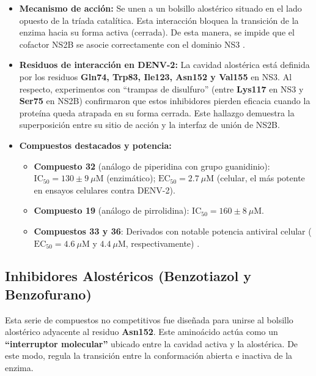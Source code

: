 \begin{itemize}
    \item \textbf{Mecanismo de acción:} Se unen a un bolsillo alostérico situado en el lado opuesto de la tríada catalítica. Esta interacción bloquea la transición de la enzima hacia su forma activa (cerrada). De esta manera, se impide que el cofactor NS2B se asocie correctamente con el dominio NS3 \cite{zephyr2023allosteric}.
    \item \textbf{Residuos de interacción en DENV-2:} La cavidad alostérica está definida por los residuos \textbf{Gln74, Trp83, Ile123, Asn152 y Val155} en NS3. Al respecto, experimentos con ``trampas de disulfuro'' (entre \textbf{Lys117} en NS3 y \textbf{Ser75} en NS2B) confirmaron que estos inhibidores pierden eficacia cuando la proteína queda atrapada en su forma cerrada. Este hallazgo demuestra la superposición entre su sitio de acción y la interfaz de unión de NS2B.
    \item \textbf{Compuestos destacados y potencia:}
    \begin{itemize}
        \item \textbf{Compuesto 32} (análogo de piperidina con grupo guanidinio): $\text{IC}_{50} = 130 \pm 9\ \mu\text{M}$ (enzimático); $\text{EC}_{50} = 2.7\ \mu\text{M}$ (celular, el más potente en ensayos celulares contra DENV-2).
        \item \textbf{Compuesto 19} (análogo de pirrolidina): $\text{IC}_{50} = 160 \pm 8\ \mu\text{M}$.
        \item \textbf{Compuestos 33 y 36}: Derivados con notable potencia antiviral celular ($\text{EC}_{50} = 4.6\ \mu\text{M}$ y $4.4\ \mu\text{M}$, respectivamente) \cite{zephyr2023allosteric}.
    \end{itemize}
\end{itemize}
\subsection{Inhibidores Alostéricos (Benzotiazol y Benzofurano)}

Esta serie de compuestos no competitivos fue diseñada para unirse al bolsillo alostérico adyacente al residuo \textbf{Asn152}. Este aminoácido actúa como un \textbf{``interruptor molecular''} ubicado entre la cavidad activa y la alostérica. De este modo, regula la transición entre la conformación abierta e inactiva de la enzima.

